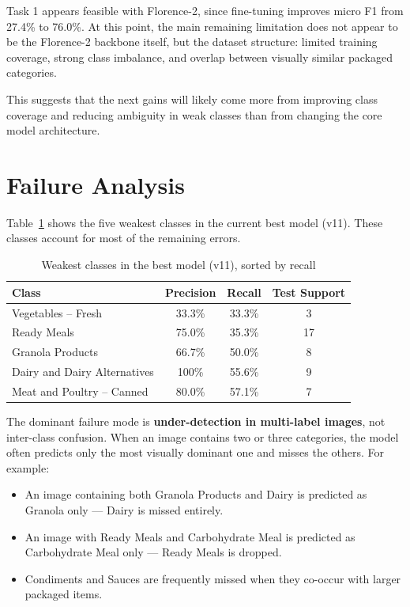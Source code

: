 \documentclass[11pt]{article}
\begin{document}
Task 1 appears feasible with Florence-2, since fine-tuning improves micro F1 from 27.4\% to 76.0\%. At this point, the main remaining limitation does not appear to be the Florence-2 backbone itself, but the dataset structure: limited training coverage, strong class imbalance, and overlap between visually similar packaged categories.

This suggests that the next gains will likely come more from improving class coverage and reducing ambiguity in weak classes than from changing the core model architecture.

\section{Failure Analysis}

Table~\ref{tab:weakclasses} shows the five weakest classes in the current best model (v11). These classes account for most of the remaining errors.

\begin{table}[h]
\centering
\caption{Weakest classes in the best model (v11), sorted by recall}
\label{tab:weakclasses}
\begin{tabular}{lccc}
\toprule
Class & Precision & Recall & Test Support \\
\midrule
Vegetables -- Fresh & 33.3\% & 33.3\% & 3 \\
Ready Meals & 75.0\% & 35.3\% & 17 \\
Granola Products & 66.7\% & 50.0\% & 8 \\
Dairy and Dairy Alternatives & 100\% & 55.6\% & 9 \\
Meat and Poultry -- Canned & 80.0\% & 57.1\% & 7 \\
\bottomrule
\end{tabular}
\end{table}

The dominant failure mode is \textbf{under-detection in multi-label images}, not inter-class confusion. When an image contains two or three categories, the model often predicts only the most visually dominant one and misses the others. For example:

\begin{itemize}[nosep,leftmargin=1.5em]
 \item An image containing both Granola Products and Dairy is predicted as Granola only --- Dairy is missed entirely.
 \item An image with Ready Meals and Carbohydrate Meal is predicted as Carbohydrate Meal only --- Ready Meals is dropped.
 \item Condiments and Sauces are frequently missed when they co-occur with larger packaged items.
\end{itemize}
\end{document}
